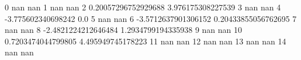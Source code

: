 0 nan nan
1 nan nan
2 0.20057296752929688 3.976175308227539
3 nan nan
4 -3.775602340698242 0.0
5 nan nan
6 -3.5712637901306152 0.20433855056762695
7 nan nan
8 -2.4821224212646484 1.2934799194335938
9 nan nan
10 0.7203474044799805 4.495949745178223
11 nan nan
12 nan nan
13 nan nan
14 nan nan
